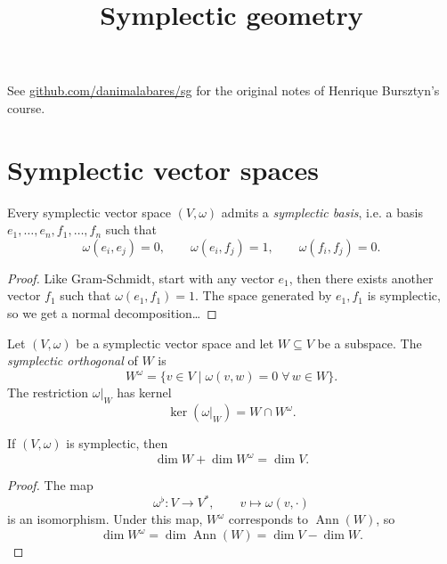 



\title{Symplectic geometry}
\maketitle

\label{section-phantom}

\tableofcontents

\noindent
See
\href{http://github.com/danimalabares/sg}%
{github.com/danimalabares/sg}
for the original notes of Henrique Bursztyn's
course.

\section{Symplectic vector spaces}
\label{section-symplectic-vector-spaces}

\begin{proposition}
\label{proposition-symplectic-basis}
Every symplectic vector space $(V,\omega)$
admits a {\it symplectic basis},
i.e. a basis $e_1,…,e_n,f_1,…,f_n$
such that
$$
\omega(e_i,e_j)=0,\qquad
\omega(e_i,f_j)=1,\qquad \omega(f_i,f_j)=0.
$$
\end{proposition}

\begin{proof}
Like Gram-Schmidt, start with any vector
$e_1$,
then there exists another vector $f_1$
such that $\omega(e_1,f_1)=1$.
The space generated by $e_1,f_1$
is symplectic, so we get a normal
decomposition…
\end{proof}

\begin{definition}
\label{definition-symplectic-orthogonal}
Let $(V,\omega)$ be a symplectic vector
space and let $W \subseteq V$ be a
subspace. The {\it symplectic orthogonal}
of $W$ is
$$
W^\omega=\{v \in V \mid \omega(v,w)=0
\;\forall\, w \in W\}.
$$
The restriction $\omega|_W$ has kernel
$$
\ker(\omega|_W)=W \cap W^\omega.
$$
\end{definition}

\begin{lemma}
\label{lemma-symplectic-orthogonal-dimension}
If $(V,\omega)$ is symplectic, then
$$
\dim W + \dim W^\omega = \dim V.
$$
\end{lemma}

\begin{proof}
The map
$$
\omega^\flat:V \longrightarrow V^*,\qquad
v \longmapsto \omega(v,\cdot)
$$
is an isomorphism. Under this map,
$W^\omega$ corresponds to $\operatorname{Ann}(W)$,
so
$$
\dim W^\omega=\dim \operatorname{Ann}(W)
=\dim V-\dim W.
$$
\end{proof}

